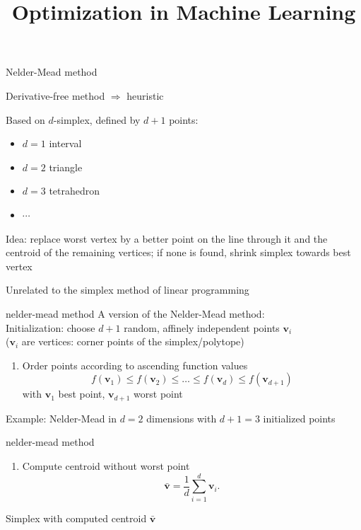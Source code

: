 \documentclass[11pt,compress,t,notes=noshow, xcolor=table]{beamer}
\title{Optimization in Machine Learning}
\newcommand{\vb}{\mathbf{v}}
\newcommand{\figcaption}[1]{\par{\centering\footnotesize #1\par}}
\begin{document}

\begin{framei}{Nelder-Mead method}
\item Derivative-free method $\Rightarrow$ heuristic 
\item Based on $d$-simplex, defined by $d + 1$ points:
\begin{itemize}
\item $d = 1$ interval
\item $d = 2$ triangle
\item $d = 3$ tetrahedron
\item $\cdots$
\end{itemize}
\item Idea: replace worst vertex by a better point on the line through it and the centroid of the remaining vertices; if none is found, shrink simplex towards best vertex
\item Unrelated to the simplex method of linear programming
\end{framei}


\begin{framev}{nelder-mead method}
A version of the Nelder-Mead method:\\
\spacer
Initialization: choose $d + 1$ random, affinely independent points $\vb_i$\\ ($\vb_i$ are vertices: corner points of the simplex/polytope)
\spacer
\begin{enumerate}
\item[1.] Order points according to ascending function values
$$f(\vb_1) \leq f(\vb_2) \leq \ldots \leq f(\vb_d) \leq f(\vb_{d + 1})$$
with $\vb_1$ best point, $\vb_{d + 1}$ worst point
\end{enumerate}
\figcaption{Example: Nelder-Mead in $d = 2$ dimensions with $d + 1 = 3$ initialized points}
\end{framev}


\begin{framev}{nelder-mead method}
\begin{enumerate}
\item[2.] Compute centroid without worst point
$$\bar{\vb} = \frac{1}{d} \sum_{i = 1}^d \vb_i.$$
\end{enumerate}
\figcaption{Simplex with computed centroid $\bar{\vb}$}
\end{framev}
\end{document}
